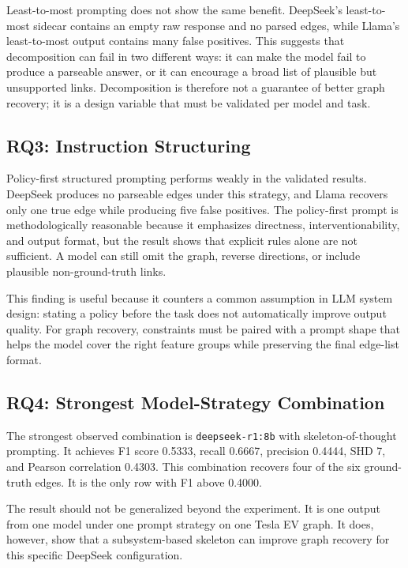 Least-to-most prompting does not show the same benefit. DeepSeek's
least-to-most sidecar contains an empty raw response and no parsed edges,
while Llama's least-to-most output contains many false positives. This
suggests that decomposition can fail in two different ways: it can make the
model fail to produce a parseable answer, or it can encourage a broad list of
plausible but unsupported links. Decomposition is therefore not a guarantee of
better graph recovery; it is a design variable that must be validated per
model and task.

\subsection{RQ3: Instruction Structuring}

Policy-first structured prompting performs weakly in the validated results.
DeepSeek produces no parseable edges under this strategy, and Llama recovers
only one true edge while producing five false positives. The policy-first
prompt is methodologically reasonable because it emphasizes directness,
interventionability, and output format, but the result shows that explicit
rules alone are not sufficient. A model can still omit the graph, reverse
directions, or include plausible non-ground-truth links.

This finding is useful because it counters a common assumption in LLM system
design: stating a policy before the task does not automatically improve
output quality. For graph recovery, constraints must be paired with a prompt
shape that helps the model cover the right feature groups while preserving the
final edge-list format.

\subsection{RQ4: Strongest Model-Strategy Combination}

The strongest observed combination is \texttt{deepseek-r1:8b} with
skeleton-of-thought prompting. It achieves F1 score 0.5333, recall 0.6667,
precision 0.4444, SHD 7, and Pearson correlation 0.4303. This combination
recovers four of the six ground-truth edges. It is the only row with F1 above
0.4000.

The result should not be generalized beyond the experiment. It is one output
from one model under one prompt strategy on one Tesla EV graph. It does,
however, show that a subsystem-based skeleton can improve graph recovery for
this specific DeepSeek configuration.

